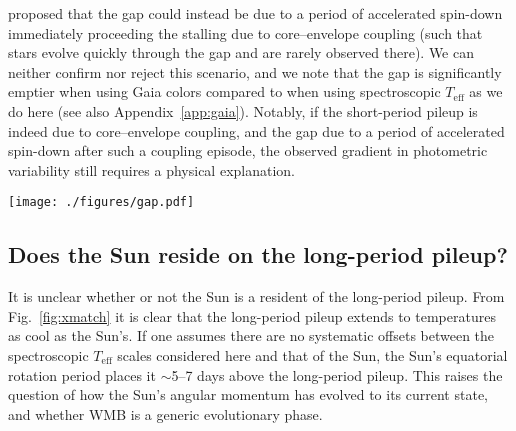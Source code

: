 \documentclass[trackchanges,twocolumn]{aastex631}
\newcommand{\lamostmcq}{LAMOST--McQuillan\xspace}
\newcommand{\mma}{MMA14\xspace}
\newcommand{\teff}{\ensuremath{T_{\mathrm{eff}}}\xspace}
\newcommand{\prot}{\ensuremath{P_\mathrm{rot}}\xspace}
\newcommand{\rper}{\ensuremath{R_\mathrm{per}}\xspace}
\begin{document}
\citet{Gordon2021} proposed that the gap could instead be due to a period of accelerated spin-down immediately proceeding the stalling due to core–envelope coupling (such that stars evolve quickly through the gap and are rarely observed there). We can neither confirm nor reject this scenario, and we note that the gap is significantly emptier when using Gaia colors \citep{DavenportCovey2018, Gordon2021} compared to when using spectroscopic \teff as we do here (see also Appendix~\ref{app:gaia}). Notably, if the short-period pileup is indeed due to core–envelope coupling, and the gap due to a period of accelerated spin-down after such a coupling episode, the observed gradient in photometric variability still requires a physical explanation.

\begin{figure*}
    \centering
    \texttt{[image: ./figures/gap.pdf]}
    \caption{The \teff--\prot distribution of the \lamostmcq (left) and \mma samples color coded by the variability amplitude, \rper. Black contours show Gaussian kernel density estimation of the plotted distributions, and the dashed line shows a constant Rossby curve of Ro~=~0.5.
    The long- and short-period pileups are separated by a relative dearth of stars with intermediate rotation periods. A strong gradient in \rper is apparent across this gap, such that variability amplitude reaches a local minimum near the gap's center.}
    \label{fig:gap}
\end{figure*}

\subsection{Does the Sun reside on the long-period pileup?} \label{subsec:thesun}

It is unclear whether or not the Sun is a resident of the long-period pileup. From Fig.~\ref{fig:xmatch} it is clear that the long-period pileup extends to temperatures as cool as the Sun's. If one assumes there are no systematic offsets between the spectroscopic \teff scales considered here and that of the Sun, the Sun's equatorial rotation period places it $\sim$5--7 days above the long-period pileup. This raises the question of how the Sun's angular momentum has evolved to its current state, and whether WMB is a generic evolutionary phase. 
\end{document}
